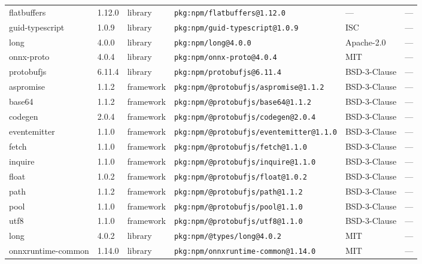 \documentclass[11pt,a4paper]{article}
\begin{document}
\begin{longtable}{|p{4cm}|p{2cm}|p{1.6cm}|p{5cm}|p{1.5cm}|p{3.5cm}|}
\raggedright flatbuffers & 1.12.0 & library & \small\texttt{pkg:npm/flatbuffers@1.12.0} & — & \small — \\
\raggedright guid-typescript & 1.0.9 & library & \small\texttt{pkg:npm/guid-typescript@1.0.9} & ISC & \small — \\
\raggedright long & 4.0.0 & library & \small\texttt{pkg:npm/long@4.0.0} & Apache-2.0 & \small — \\
\raggedright onnx-proto & 4.0.4 & library & \small\texttt{pkg:npm/onnx-proto@4.0.4} & MIT & \small — \\
\raggedright protobufjs & 6.11.4 & library & \small\texttt{pkg:npm/protobufjs@6.11.4} & BSD-3-Clause & \small — \\
\raggedright aspromise & 1.1.2 & framework & \small\texttt{pkg:npm/@protobufjs/aspromise@1.1.2} & BSD-3-Clause & \small — \\
\raggedright base64 & 1.1.2 & framework & \small\texttt{pkg:npm/@protobufjs/base64@1.1.2} & BSD-3-Clause & \small — \\
\raggedright codegen & 2.0.4 & framework & \small\texttt{pkg:npm/@protobufjs/codegen@2.0.4} & BSD-3-Clause & \small — \\
\raggedright eventemitter & 1.1.0 & framework & \small\texttt{pkg:npm/@protobufjs/eventemitter@1.1.0} & BSD-3-Clause & \small — \\
\raggedright fetch & 1.1.0 & framework & \small\texttt{pkg:npm/@protobufjs/fetch@1.1.0} & BSD-3-Clause & \small — \\
\raggedright inquire & 1.1.0 & framework & \small\texttt{pkg:npm/@protobufjs/inquire@1.1.0} & BSD-3-Clause & \small — \\
\raggedright float & 1.0.2 & framework & \small\texttt{pkg:npm/@protobufjs/float@1.0.2} & BSD-3-Clause & \small — \\
\raggedright path & 1.1.2 & framework & \small\texttt{pkg:npm/@protobufjs/path@1.1.2} & BSD-3-Clause & \small — \\
\raggedright pool & 1.1.0 & framework & \small\texttt{pkg:npm/@protobufjs/pool@1.1.0} & BSD-3-Clause & \small — \\
\raggedright utf8 & 1.1.0 & framework & \small\texttt{pkg:npm/@protobufjs/utf8@1.1.0} & BSD-3-Clause & \small — \\
\raggedright long & 4.0.2 & library & \small\texttt{pkg:npm/@types/long@4.0.2} & MIT & \small — \\
\raggedright onnxruntime-common & 1.14.0 & library & \small\texttt{pkg:npm/onnxruntime-common@1.14.0} & MIT & \small — \\

\end{longtable}
\end{document}
